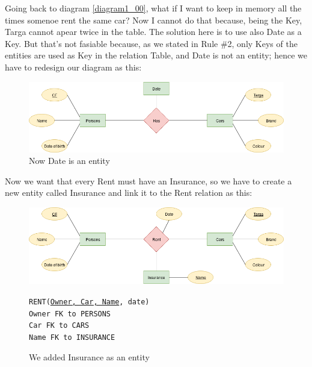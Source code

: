 \documentclass[class=book, crop=false, oneside]{standalone}
\newcommand\tab[1][1cm]{\hspace*{#1}}
\begin{document}
Going back to diagram \ref{diagram1_00}, what if I want to keep in memory all the times somenoe rent the same car?
Now I cannot do that because, being the Key, Targa cannot apear twice in the table.
The solution here is to use also Date as a Key.
But that's not fasiable because, as we stated in Rule \#2, only Keys of the entities are used as Key in the relation Table, and Date is not an entity; hence we have to redesign our diagram as this:
\begin{figure}[H]
	\includegraphics[width=\textwidth,keepaspectratio]{diagram1_03.png}
	\caption{Now Date is an entity}
	\label{diagram1_03}
\end{figure}
\vskip 20pt

Now we want that every Rent must have an Insurance, so we have to create a new entity called Insurance and link it to the Rent relation as this:
\begin{figure}[H]
	\includegraphics[width=\textwidth,keepaspectratio]{diagram1_04.png}
	\caption{We added Insurance as an entity}
	\texttt{RENT(\underline{Owner, Car, Name}, date)}\\
		\tab[.8cm] \texttt{Owner FK to PERSONS}\\
		\tab[.8cm] \texttt{Car FK to CARS}\\
		\tab[.8cm] \texttt{Name FK to INSURANCE}
	\label{diagram1_04}
\end{figure}
\vskip 20pt
\end{document}

